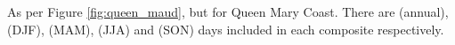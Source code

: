 \label{fig:queen_mary}
As per Figure \ref{fig:queen_maud}, but for Queen Mary Coast. There are (annual),  (DJF),  (MAM),  (JJA) and  (SON) days included in each composite respectively.